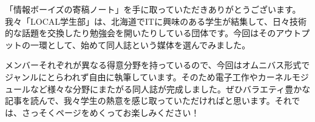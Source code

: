 「情報ボーイズの寄稿ノート」を手に取っていただきありがとうございます。我々「LOCAL学生部」は、北海道でITに興味のある学生が結集して、日々技術的な話題を交換したり勉強会を開いたりしている団体です。今回はそのアウトプットの一環として、始めて同人誌という媒体を選んでみました。

メンバーそれぞれが異なる得意分野を持っているので、今回はオムニバス形式でジャンルにとらわれず自由に執筆しています。そのため電子工作やカーネルモジュールなど様々な分野にまたがる同人誌が完成しました。ぜひバラエティ豊かな記事を読んで、我々学生の熱意を感じ取っていただければと思います。それでは、さっそくページをめくってお楽しみください！
